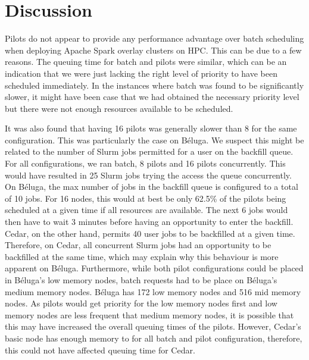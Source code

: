 \documentclass{IEEEtran}
\begin{document}
\section{Discussion}\label{sec:discussion}


Pilots do not appear to provide any performance advantage over batch
scheduling when deploying Apache Spark overlay clusters on HPC.
This can be due to a few reasons. The queuing time for batch and pilots were similar, 
which can be an indication that we were just lacking the right level of priority to 
have been scheduled immediately. In the instances where batch was found to be significantly slower,
it might have been case that we had obtained the necessary priority level but there
were not enough resources available to be scheduled.

It was also found that having 16 pilots was generally slower than 8 for the same
configuration. This was particularly the case on B\'eluga. We suspect this might be
related to the number of Slurm jobs permitted for a user on the backfill queue. For
all configurations, we ran batch, 8 pilots and 16 pilots concurrently. This would have
resulted in 25 Slurm jobs trying the access the queue concurrently. On
B\'eluga, the max number of jobs in the backfill queue is configured to a
total of 10 jobs. For 16 nodes, this would at best be only 62.5\% of the
pilots being scheduled at a given time if all resources are available.
The next 6 jobs would then have to wait 3 minutes before having an opportunity to enter the
backfill. Cedar, on the other hand, permits 40 user jobs to be backfilled at a given time.
Therefore, on Cedar, all concurrent Slurm jobs had an opportunity to be backfilled at
the same time, which may explain why this behaviour is more apparent on B\'eluga. Furthermore,
while both pilot configurations could be placed in B\'eluga's low memory nodes, batch requests
had to be place on B\'eluga's medium memory nodes. B\'eluga has 172 low memory nodes and
516 mid memory nodes. As pilots would get priority for the low memory nodes first and 
low memory nodes are less frequent that medium memory nodes, it is possible that this
may have increased the overall queuing times of the pilots. However, Cedar's basic
node has enough memory to for all batch and pilot configuration, therefore, this could not
have affected queuing time for Cedar.
\end{document}
